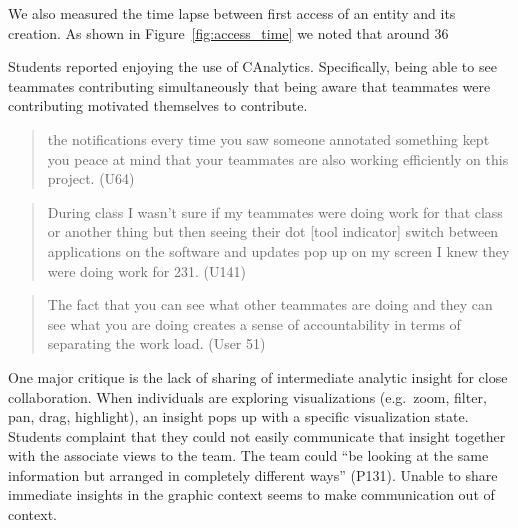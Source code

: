 We also measured the time lapse between first access of an entity and its creation. As shown in Figure~\ref{fig:access_time} we noted that around 36%

Students reported enjoying the use of CAnalytics. Specifically, being
able to see teammates contributing simultaneously that being aware that
teammates were contributing motivated themselves to contribute.

\begin{quote}
the notifications every time you saw someone annotated something kept
you peace at mind that your teammates are also working efficiently on
this project. (U64)
\end{quote}

\begin{quote}
During class I wasn't sure if my teammates were doing work for that
class or another thing but then seeing their dot {[}tool indicator{]}
switch between applications on the software and updates pop up on my
screen I knew they were doing work for 231. (U141)
\end{quote}

\begin{quote}
The fact that you can see what other teammates are doing and they can
see what you are doing creates a sense of accountability in terms of
separating the work load. (User 51)
\end{quote}

One major critique is the lack of sharing of intermediate analytic
insight for close collaboration. When individuals are exploring
visualizations (e.g.~zoom, filter, pan, drag, highlight), an insight
pops up with a specific visualization state. Students complaint that
they could not easily communicate that insight together with the
associate views to the team. The team could ``be looking at the same
information but arranged in completely different ways'' (P131). Unable
to share immediate insights in the graphic context seems to make
communication out of context.

